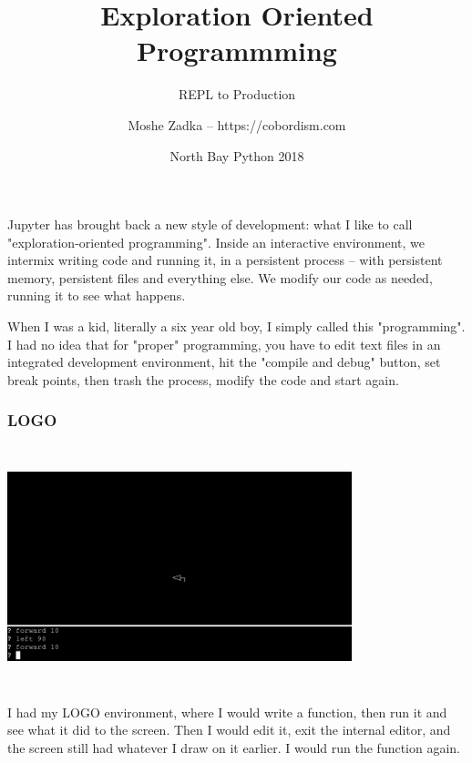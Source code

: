 \usepackage[utf8]{inputenc}
\usepackage{listings}
\usepackage{textcomp}
\usepackage{fancyvrb}

\title{Exploration Oriented Programmming}
\subtitle{REPL to Production}
\author{Moshe Zadka -- https://cobordism.com}
\date{North Bay Python 2018}
 

 
\begin{titlepage}
\maketitle
\end{titlepage}

\frame{\titlepage}

Jupyter has brought back a new style of development:
what I like to call
"exploration-oriented programming".
Inside an interactive environment,
we intermix writing code
and running it,
in a persistent process --
with persistent memory,
persistent files and
everything else.
We modify our code as needed,
running it to
see what happens.

When I was a kid,
literally a six year old boy,
I simply called this
"programming".
I had no idea that for "proper"
programming,
you have to edit text files in an integrated development environment,
hit the "compile and debug" button,
set break points,
then trash the process,
modify the code and start again.

\begin{frame}[fragile]
\frametitle{LOGO}

\includegraphics[height=7cm,width=10cm]{logo.png}

\end{frame}


I had my LOGO environment,
where I would write a function,
then run it and see what it did to the screen.
Then I would edit it,
exit the internal editor,
and the screen still had whatever I draw on it earlier.
I would run the function again.

